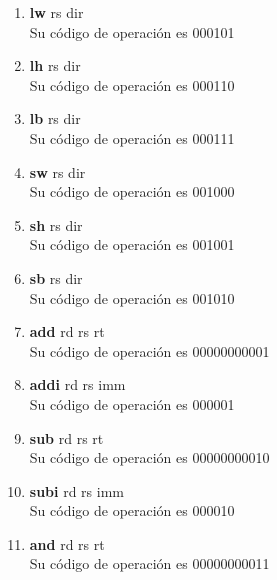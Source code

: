\documentclass{article}
\begin{document}
\begin{enumerate}
{			\begin{enumerate}
				\item{ \textbf{lw} rs dir\\
					Su código de operación es 000101  \\
				}
				
				\item{ \textbf{lh} rs dir\\
					Su código de operación es 000110 \\
				}
				
				\item{ \textbf{lb} rs dir\\
					Su código de operación es 000111  \\
				}
				
				\item{ \textbf{sw} rs dir\\
					Su código de operación es 001000 \\
				}
				
				\item{ \textbf{sh} rs dir\\
					Su código de operación es 001001\\
				}
				
				\item{ \textbf{sb} rs dir\\
					Su código de operación es 001010\\
				}
				
				\item{ \textbf{add} rd rs rt\\
					Su código de operación es 00000000001\\
				}
				
				\item{ \textbf{addi} rd rs imm\\
					Su código de operación es 000001\\
				}
				
				\item{ \textbf{sub} rd rs rt\\
					Su código de operación es 00000000010 \\
				}
				
				\item{ \textbf{subi} rd rs imm\\
					Su código de operación es 000010 \\
				}
				
				\item{ \textbf{and} rd rs rt\\
					Su código de operación es 00000000011\\
				}
				

\end{enumerate}}
\end{enumerate}
\end{document}
